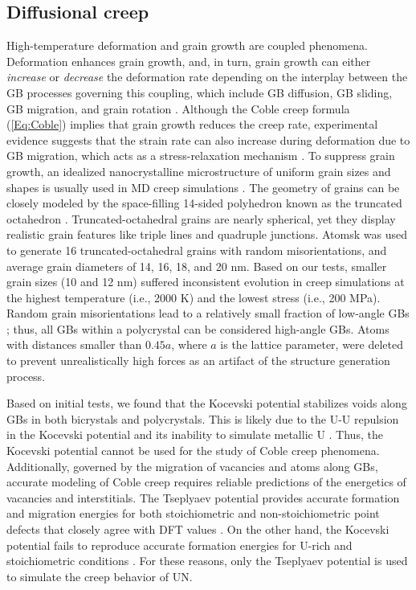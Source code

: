 \documentclass[preprint,12pt,sort&compress]{elsarticle}
\newcommand{\?}{\stackrel{?}{=}}
\begin{document}
\subsection{Diffusional creep}

High-temperature deformation and grain growth are coupled phenomena. Deformation enhances grain growth, and, in turn, grain growth can either \textit{increase} or \textit{decrease} the deformation rate depending on the interplay between the GB processes governing this coupling, which include GB diffusion, GB sliding, GB migration, and grain rotation \cite{Haslam2004}. Although the Coble creep formula (\cref{Eq:Coble}) implies that grain growth reduces the creep rate, experimental evidence suggests that the strain rate can also increase during deformation due to GB migration, which acts as a stress-relaxation mechanism \cite{Haslam2004}. To suppress grain growth, an idealized nanocrystalline microstructure of uniform grain sizes and shapes is usually used in MD creep simulations \cite{Keblinski1998, Yamakov2002}. The geometry of grains can be closely modeled by the space-filling 14-sided polyhedron known as the truncated octahedron \cite{Yamakov2002, Olander2017}. Truncated-octahedral grains are nearly spherical, yet they display realistic grain features like triple lines and quadruple junctions. Atomsk \cite{Hirel2015} was used to generate 16 truncated-octahedral grains with random misorientations, and average grain diameters of 14, 16, 18, and 20 nm. Based on our tests, smaller grain sizes (10 and 12 nm) suffered inconsistent evolution in creep simulations at the highest temperature (i.e., 2000 K) and the lowest stress (i.e., 200 MPa). Random grain misorientations lead to a relatively small fraction of low-angle GBs \cite{Yamakov2002, Haslam2004}; thus, all GBs within a polycrystal can be considered high-angle GBs. Atoms with distances smaller than $0.45a$, where $a$ is the lattice parameter, were deleted to prevent unrealistically high forces as an artifact of the structure generation process.

Based on initial tests, we found that the Kocevski potential stabilizes voids along GBs in both bicrystals and polycrystals. This is likely due to the U-U repulsion in the Kocevski potential and its inability to simulate metallic U \cite{AbdulHameed2024}. Thus, the Kocevski potential cannot be used for the study of Coble creep phenomena. Additionally, governed by the migration of vacancies and atoms along GBs, accurate modeling of Coble creep requires reliable predictions of the energetics of vacancies and interstitials. The Tseplyaev potential provides accurate formation and migration energies for both stoichiometric and non-stoichiometric point defects that closely agree with DFT values \cite{Kuksin2016,Tseplyaev2016,AbdulHameed2024}. On the other hand, the Kocevski potential fails to reproduce accurate formation energies for U-rich and stoichiometric conditions \cite{AbdulHameed2024}. For these reasons, only the Tseplyaev potential is used to simulate the creep behavior of UN.
\end{document}
